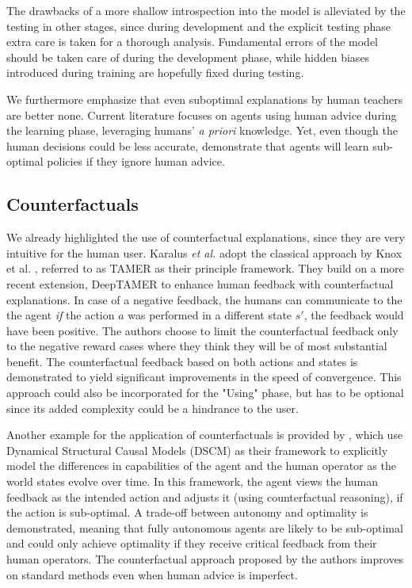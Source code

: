 \documentclass[twoside,11pt]{article}
\begin{document}
The drawbacks of a more shallow introspection into the model is alleviated by the testing in other stages, since during development and the explicit testing phase extra care is taken for a thorough analysis. Fundamental errors of the model should be taken care of during the development phase, while hidden biases introduced during training are hopefully fixed during testing.

We furthermore emphasize that even suboptimal explanations by human teachers are better none. Current literature focuses on agents using human advice during the learning phase, leveraging humans' \emph{a priori} knowledge. Yet, even though the human decisions could be less accurate, \cite{Zhang:2020:human_out_loop} demonstrate that agents will learn sub-optimal policies if they ignore human advice. 

\subsection{Counterfactuals}

We already highlighted the use of counterfactual explanations, since they are very intuitive for the human user. Karalus \emph{et al.} adopt the classical approach by Knox et al. \cite{Knox:2008:TAMER}, referred to as TAMER as their principle framework. They build on a more recent extension, DeepTAMER \cite{Warnell:2018:DeepTAMER} to enhance human feedback with counterfactual explanations. In case of a negative feedback, the humans can communicate to the the agent \emph{if} the action $a$ was performed in a different state $s'$, the feedback would have been positive. The authors choose to limit the counterfactual feedback only to the negative reward cases where they think they will be of most substantial benefit. The counterfactual feedback based on both actions and states is demonstrated to yield significant improvements in the speed of convergence. This approach could also be incorporated for the "Using" phase, but has to be optional since its added complexity could be a hindrance to the user.

Another example for the application of counterfactuals is provided by \cite{Pearl:2009:Causality}, which use Dynamical Structural Causal Models (DSCM) as their framework to explicitly model the differences in capabilities of the agent and the human operator as the world states evolve over time. In this framework, the agent views the human feedback as the intended action and adjusts it (using counterfactual reasoning), if the action is sub-optimal. A trade-off between autonomy and optimality is demonstrated, meaning that fully autonomous agents are likely to be sub-optimal and could only achieve optimality if they receive critical feedback from their human operators. The counterfactual approach proposed by the authors improves on standard methods even when human advice is imperfect.
\end{document}

